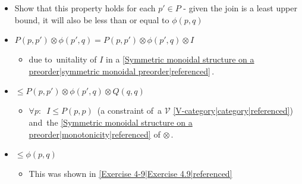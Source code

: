 \begin{itemize}
\begin{itemize}
            \item Show that this property holds for each $p' \in P$ - given the join is a least upper bound, it will also be less than or equal to $\phi(p,q)$
            \item $P(p,p')\otimes\phi(p',q) = P(p,p')\otimes\phi(p',q)\otimes I$
                  \begin{itemize}
                    \item due to \,unitality of $I$ in a \ref{Symmetric monoidal structure on a preorder|symmetric monoidal preorder|referenced}\,.
                  \end{itemize}
            \item $\leq P(p,p')\otimes \phi(p',q)\otimes Q(q,q)$
                  \begin{itemize}
                    \item $\forall p:$ \,$I \leq P(p,p)$\, (a constraint of \,a $\mathcal{V}$ \ref{V-category|category|referenced})\, and \,the \ref{Symmetric monoidal structure on a preorder|monotonicity|referenced} of $\otimes$\,.
                  \end{itemize}
            \item $\leq\phi(p,q)$
                  \begin{itemize}
                    \item This was shown in \ref{Exercise 4-9|Exercise 4.9|referenced}
                  \end{itemize}
          \end{itemize}

  \end{itemize}
